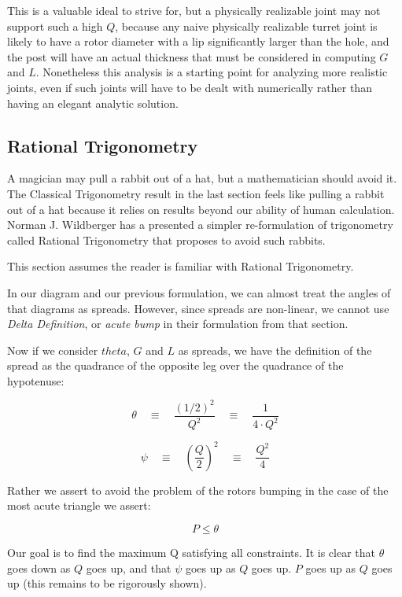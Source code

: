 \documentclass[11pt]{article}
\begin{document}
This is a valuable ideal to strive for, but a physically realizable joint may not support such a high $Q$,
because any naive physically realizable
turret joint is likely to have a rotor diameter with a lip significantly larger than the hole, and the post will have an actual
thickness that must be considered in computing $G$ and $L$. Nonetheless this analysis is a starting point for analyzing more
realistic joints, even if such joints will have to be dealt with numerically rather than having an elegant analytic solution.

\label{rationalphiproof}

\subsection{Rational Trigonometry}

A magician may pull a rabbit out of a hat, but a mathematician should avoid it.
The Classical Trigonometry result in the last section feels like pulling a rabbit out of a hat because it relies
on results beyond our ability of human calculation.  Norman J. Wildberger has a presented a simpler re-formulation
of trigonometry called Rational Trigonometry\cite{wildberger2005} that proposes to avoid such rabbits.

This section assumes the reader is familiar with Rational Trigonometry.

In our diagram and our previous formulation, we can almost treat the angles of that diagrams as spreads. However,
since spreads are non-linear, we cannot use \textit{Delta Definition},  or \textit{acute bump} in their
formulation from that section.


Now if we consider $theta$, $G$ and $L$ as spreads, we have the definition of the spread as the quadrance of the
opposite leg over the quadrance of the hypotenuse:


\[ \tag{rational-theta} \theta \quad \equiv \quad \frac{(1/2)^2}{Q^2} \quad \equiv \quad \frac{1}{4 \cdot Q^2}  \]

\[ \tag{rational-psi} \psi \quad \equiv \quad (\frac{Q}{2})^2 \quad \equiv \quad \frac{Q^2}{4}  \]


Rather we assert to avoid the problem of the rotors bumping in the case of the most acute triangle we assert:

\[ \tag{rational acute bump} P \leq \theta  \]

Our goal is to find the maximum Q satisfying all constraints.  It is clear that $\theta$ goes down as $Q$ goes
up, and that $\psi$ goes up as $Q$ goes up.  $P$ goes up as $Q$ goes up (this remains to be rigorously shown).
\end{document}
